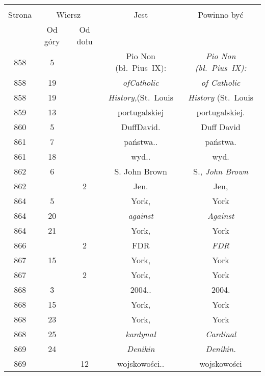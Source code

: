 \documentclass[a4paper,11pt]{article}
\begin{document}
\begin{center}
  \begin{tabular}{|c|c|c|c|c|}
    \hline
    & \multicolumn{2}{c|}{} & & \\
    Strona & \multicolumn{2}{c|}{Wiersz} & Jest
                              & Powinno być \\ \cline{2-3}
    & Od góry & Od dołu & & \\
    \hline
    858 &  5 & & Pio Non (bł.~Pius~IX): & \emph{Pio Non (bł.~Pius~IX):} \\
    858 & 19 & & \emph{ofCatholic} & \emph{of Catholic} \\
    858 & 19 & & \emph{History,}(St.~Louis & \emph{History} (St.~Louis \\
    859 & 13 & & portugalskiej & portugalskiej. \\
    860 &  5 & & DuffDavid. & Duff David \\
    861 &  7 & & państwa.. & państwa. \\
    861 & 18 & & wyd.. & wyd. \\
    862 &  6 & & S. John Brown & S., \emph{John Brown} \\
    862 & &  2 & Jen. & Jen, \\
    864 &  5 & & York, & York \\
    864 & 20 & & \emph{against} & \emph{Against} \\
    864 & 21 & & York, & York \\
    866 & &  2 & FDR & \emph{FDR} \\
    867 & 15 & & York, & York \\
    867 & &  2 & York, & York \\
    868 &  3 & & 2004.. & 2004. \\
    868 & 15 & & York, & York \\
    868 & 23 & & York, & York \\
    868 & 25 & & \emph{kardynał} & \emph{Cardinal} \\
    869 & 24 & & \emph{Denikin} & \emph{Denikin.} \\
    869 & & 12 & wojskowości.. & wojskowości \\

\end{tabular}
\end{center}
\end{document}
